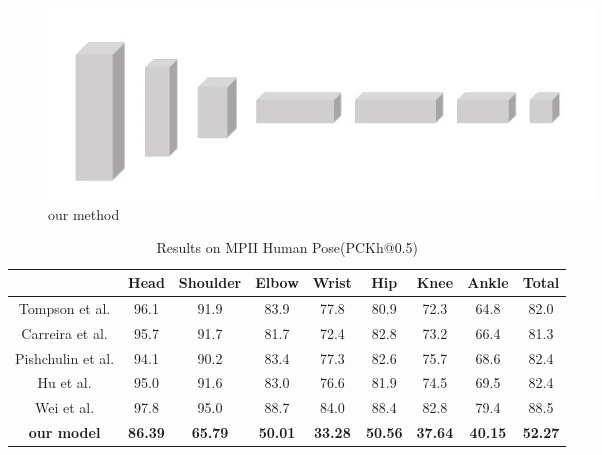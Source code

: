 \documentclass[final]{cvpr}
\begin{document}
\begin{figure}[h]
\centering
\includegraphics[width=0.7\textwidth]{our method.jpg}
\caption{our method}
\end{figure}
\begin{table}[h]
\begin{center}
\caption{Results on MPII Human Pose(PCKh@0.5)}
\begin{tabular}{c|ccccccc|c}
\hline
&Head&Shoulder&Elbow&Wrist&Hip&Knee& Ankle&Total \\
\hline
Tompson et al.\cite{newell2016stacked}&96.1&91.9&83.9&77.8&80.9&72.3&64.8&82.0\\
Carreira et al\cite{newell2016stacked}. & 95.7&91.7&81.7&72.4&82.8&73.2&66.4&81.3\\
Pishchulin et al.\cite{newell2016stacked}& 94.1&90.2&83.4&77.3&82.6&75.7&68.6&82.4\\
Hu et al.\cite{newell2016stacked}&95.0&91.6&83.0&76.6&81.9&74.5&69.5&82.4\\
Wei et al\cite{newell2016stacked}. &97.8&95.0&88.7&84.0&88.4&82.8&79.4&88.5\\
\hline
\textbf{our model}&\textbf{86.39}&\textbf{65.79}&\textbf{50.01}&\textbf{33.28}&\textbf{50.56}&\textbf{37.64}&\textbf{40.15}&\textbf{52.27}   \\
\hline
\end{tabular}
\end{center}
\end{table}
\end{document}
